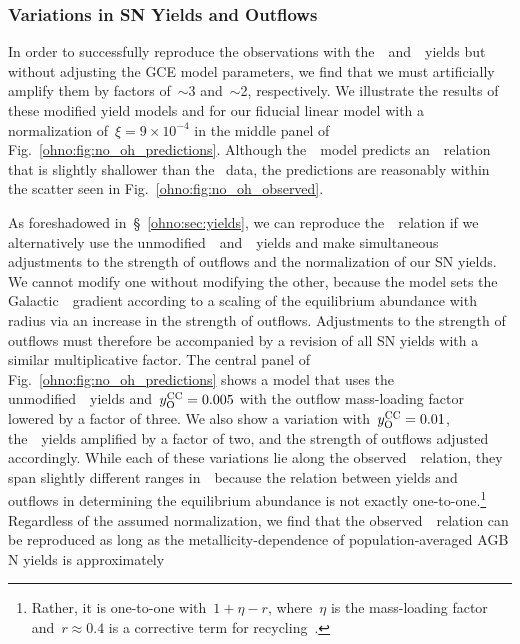 \subsubsection{Variations in SN Yields and Outflows}
\label{ohno:sec:results:yields:variations}

In order to successfully reproduce the observations with
the~\cristallo~and~\ventura~yields
but without adjusting the GCE model parameters,
we find that we
must artificially amplify them by factors of~$\sim$3 and~$\sim$2, respectively.
We illustrate the results of these modified yield models and for our fiducial
linear model with a normalization of~$\xi = 9\times10^{-4}$ in the middle panel
of Fig.~\ref{ohno:fig:no_oh_predictions}.
Although the~\ventura~model predicts an~\ohno~relation that is slightly
shallower than the~\citet{Dopita2016} data, the predictions are
reasonably within the scatter seen in Fig.~\ref{ohno:fig:no_oh_observed}.
\par
As foreshadowed in~\S~\ref{ohno:sec:yields}, we can reproduce the~\ohno~relation if
we alternatively use the unmodified~\cristallo~and~\ventura~yields and make
simultaneous adjustments to the strength of outflows and the normalization of
our SN yields.
We cannot modify one without modifying the other, because the
\citet{Johnson2021} model sets the Galactic~\oh~gradient according to a scaling
of the equilibrium abundance with radius via an increase in the strength of
outflows.
Adjustments to the strength of outflows must therefore be accompanied by a
revision of all SN yields with a similar multiplicative factor.
The central panel of Fig.~\ref{ohno:fig:no_oh_predictions} shows a model that uses
the unmodified~\cristallo~yields and~$y_\text{O}^\text{CC} = 0.005$ with the outflow
mass-loading factor lowered by a factor of three.
We also show a variation with~$y_\text{O}^\text{CC} = 0.01$, the~\cristallo~yields amplified
by a factor of two, and the strength of outflows adjusted accordingly.
While each of these variations lie along the observed~\ohno~relation, they span
slightly different ranges in~\oh~because the relation between yields and
outflows in determining the equilibrium abundance is not exactly
one-to-one.\footnote{
	Rather, it is one-to-one with~$1 + \eta - r$, where~$\eta$ is the
	mass-loading factor and~$r \approx 0.4$ is a corrective term for
	recycling~\citep{Weinberg2017b}.
}
Regardless of the assumed normalization, we find that the
observed~\ohno~relation can be reproduced as long as the
metallicity-dependence of population-averaged AGB N yields is approximately
